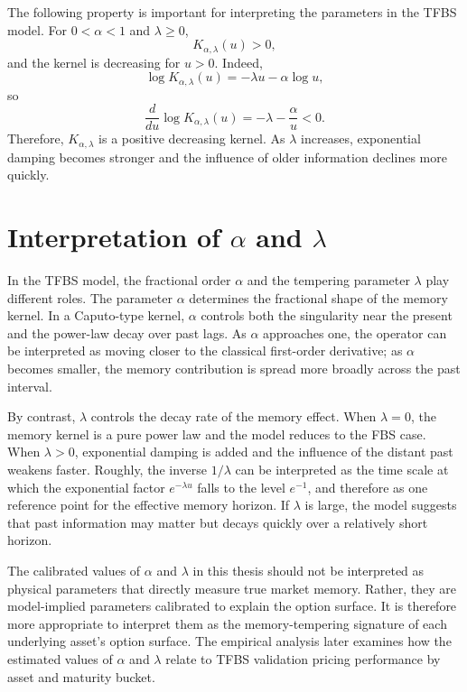 \documentclass[11pt,a4paper]{report}
\begin{document}
The following property is important for interpreting the parameters in the TFBS model. For $0<\alpha<1$ and $\lambda\ge0$,
\[
K_{\alpha,\lambda}(u)>0,
\]
and the kernel is decreasing for $u>0$. Indeed,
\[
\log K_{\alpha,\lambda}(u)
=
-\lambda u-\alpha\log u,
\]
so
\[
\frac{d}{du}\log K_{\alpha,\lambda}(u)
=
-\lambda-\frac{\alpha}{u}<0.
\]
Therefore, $K_{\alpha,\lambda}$ is a positive decreasing kernel. As $\lambda$ increases, exponential damping becomes stronger and the influence of older information declines more quickly.

\section{Interpretation of \texorpdfstring{$\alpha$}{alpha} and \texorpdfstring{$\lambda$}{lambda}}

In the TFBS model, the fractional order $\alpha$ and the tempering parameter $\lambda$ play different roles. The parameter $\alpha$ determines the fractional shape of the memory kernel. In a Caputo-type kernel, $\alpha$ controls both the singularity near the present and the power-law decay over past lags. As $\alpha$ approaches one, the operator can be interpreted as moving closer to the classical first-order derivative; as $\alpha$ becomes smaller, the memory contribution is spread more broadly across the past interval.

By contrast, $\lambda$ controls the decay rate of the memory effect. When $\lambda=0$, the memory kernel is a pure power law and the model reduces to the FBS case. When $\lambda>0$, exponential damping is added and the influence of the distant past weakens faster. Roughly, the inverse $1/\lambda$ can be interpreted as the time scale at which the exponential factor $e^{-\lambda u}$ falls to the level $e^{-1}$, and therefore as one reference point for the effective memory horizon. If $\lambda$ is large, the model suggests that past information may matter but decays quickly over a relatively short horizon.

The calibrated values of $\alpha$ and $\lambda$ in this thesis should not be interpreted as physical parameters that directly measure true market memory. Rather, they are model-implied parameters calibrated to explain the option surface. It is therefore more appropriate to interpret them as the memory-tempering signature of each underlying asset's option surface. The empirical analysis later examines how the estimated values of $\alpha$ and $\lambda$ relate to TFBS validation pricing performance by asset and maturity bucket.
\end{document}
